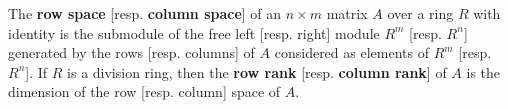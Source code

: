 The \textbf{row space} [resp. \textbf{column space}] of an $n \times m$ matrix $A$ over a ring $R$ with identity is the submodule of the free left [resp. right] module $R^m$ [resp. $R^n$] generated by the rows [resp. columns] of $A$ considered as elements of $R^m$ [resp. $R^n$]. If $R$ is a division ring, then the \textbf{row rank} [resp. \textbf{column rank}] of $A$ is the dimension of the row [resp. column] space of $A$.
